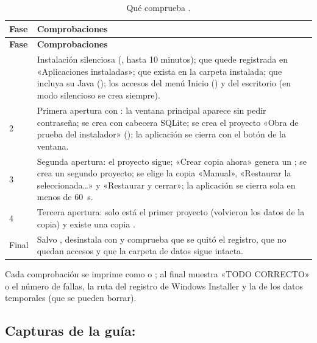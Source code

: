 \begin{longtable}{L{1.0cm}L{13.8cm}}
	\caption{Qué comprueba .} \label{tab:dis-probar} \\
	\hline
	\textbf{Fase} & \textbf{Comprobaciones} \\ \hline
	\endfirsthead
	\hline
	\textbf{Fase} & \textbf{Comprobaciones} \\ \hline
	\endhead
	\hline
	 & Instalación silenciosa (, hasta 10 minutos); que quede registrada en
	«Aplicaciones instaladas»; que exista  en la carpeta instalada; que incluya su Java
	(); los accesos del menú Inicio
	() y del escritorio (en modo silencioso se
	crea siempre). \\
	2 & Primera apertura con : la ventana principal
	aparece sin pedir contraseña; se crea  con cabecera SQLite; se crea el proyecto «Obra de prueba
	del instalador» (); la aplicación se cierra con
	el botón de la ventana. \\
	3 & Segunda apertura: el proyecto sigue; «Crear copia ahora» genera un ; se crea un segundo
	proyecto; se elige la copia «Manual», «Restaurar la seleccionada\ldots» y «Restaurar y cerrar»; la aplicación se
	cierra sola en menos de 60~s. \\
	4 & Tercera apertura: solo está el primer proyecto (volvieron los datos de la copia) y existe una copia
	. \\
	Final & Salvo , desinstala con  y comprueba que se quitó el
	registro, que no quedan accesos y que la carpeta de datos sigue intacta. \\
\end{longtable}

Cada comprobación se imprime como \ruta{[OK]} o \ruta{[FALLA]}; al final muestra «TODO CORRECTO» o el número de
fallas, la ruta del registro de Windows Installer y la de los datos temporales (que se pueden borrar).

\subsection{Capturas de la guía: }


